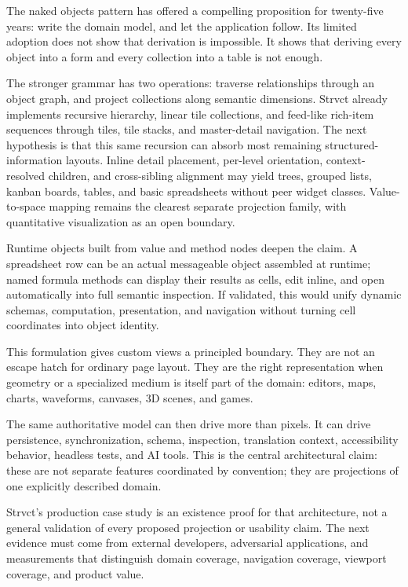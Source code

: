 \documentclass[sigplan,review,anonymous,10pt]{acmart}
\begin{document}
The naked objects pattern has offered a compelling proposition for twenty-five years: write the domain model, and let the application follow. Its limited adoption does not show that derivation is impossible. It shows that deriving every object into a form and every collection into a table is not enough.

The stronger grammar has two operations: traverse relationships through an object graph, and project collections along semantic dimensions. Strvct already implements recursive hierarchy, linear tile collections, and feed-like rich-item sequences through tiles, tile stacks, and master-detail navigation. The next hypothesis is that this same recursion can absorb most remaining structured-information layouts. Inline detail placement, per-level orientation, context-resolved children, and cross-sibling alignment may yield trees, grouped lists, kanban boards, tables, and basic spreadsheets without peer widget classes. Value-to-space mapping remains the clearest separate projection family, with quantitative visualization as an open boundary.

Runtime objects built from value and method nodes deepen the claim. A spreadsheet row can be an actual messageable object assembled at runtime; named formula methods can display their results as cells, edit inline, and open automatically into full semantic inspection. If validated, this would unify dynamic schemas, computation, presentation, and navigation without turning cell coordinates into object identity.

This formulation gives custom views a principled boundary. They are not an escape hatch for ordinary page layout. They are the right representation when geometry or a specialized medium is itself part of the domain: editors, maps, charts, waveforms, canvases, 3D scenes, and games.

The same authoritative model can then drive more than pixels. It can drive persistence, synchronization, schema, inspection, translation context, accessibility behavior, headless tests, and AI tools. This is the central architectural claim: these are not separate features coordinated by convention; they are projections of one explicitly described domain.

Strvct's production case study is an existence proof for that architecture, not a general validation of every proposed projection or usability claim. The next evidence must come from external developers, adversarial applications, and measurements that distinguish domain coverage, navigation coverage, viewport coverage, and product value.
\end{document}

